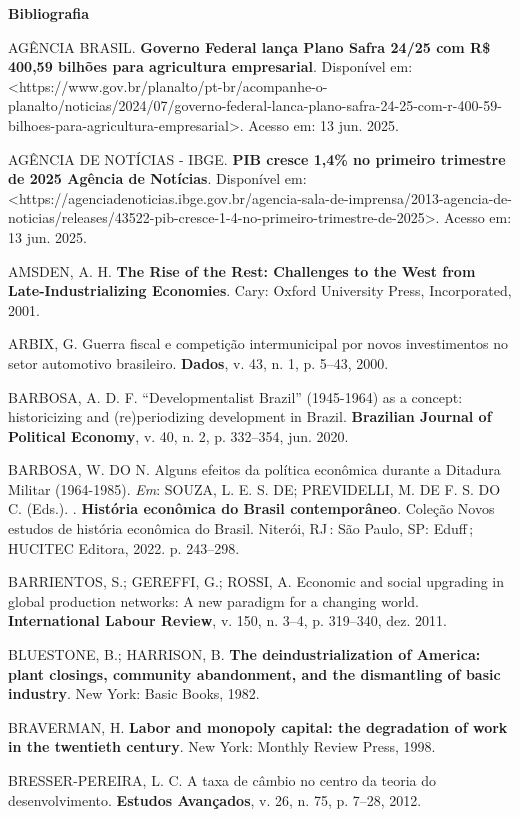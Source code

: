 \textbf{Bibliografia}

AGÊNCIA BRASIL. \textbf{Governo Federal lança Plano Safra 24/25 com R\$
400,59 bilhões para agricultura empresarial}. Disponível em:
\textless https://www.gov.br/planalto/pt-br/acompanhe-o-planalto/noticias/2024/07/governo-federal-lanca-plano-safra-24-25-com-r-400-59-bilhoes-para-agricultura-empresarial\textgreater.
Acesso em: 13 jun. 2025.

AGÊNCIA DE NOTÍCIAS - IBGE. \textbf{PIB cresce 1,4\% no primeiro
trimestre de 2025 \textbar{} Agência de Notícias}. Disponível em:
\textless https://agenciadenoticias.ibge.gov.br/agencia-sala-de-imprensa/2013-agencia-de-noticias/releases/43522-pib-cresce-1-4-no-primeiro-trimestre-de-2025\textgreater.
Acesso em: 13 jun. 2025.

AMSDEN, A. H. \textbf{The Rise of the Rest: Challenges to the West from
Late-Industrializing Economies}. Cary: Oxford University Press,
Incorporated, 2001.

ARBIX, G. Guerra fiscal e competição intermunicipal por novos
investimentos no setor automotivo brasileiro. \textbf{Dados}, v. 43, n.
1, p. 5--43, 2000.

BARBOSA, A. D. F. ``Developmentalist Brazil'' (1945-1964) as a concept:
historicizing and (re)periodizing development in Brazil.
\textbf{Brazilian Journal of Political Economy}, v. 40, n. 2, p.
332--354, jun. 2020.

BARBOSA, W. DO N. Alguns efeitos da política econômica durante a
Ditadura Militar (1964-1985). \emph{Em}: SOUZA, L. E. S. DE; PREVIDELLI,
M. DE F. S. DO C. (Eds.). . \textbf{História econômica do Brasil
contemporâneo}. Coleção Novos estudos de história econômica do Brasil.
Niterói, RJ\,: São Paulo, SP: Eduff\,; HUCITEC Editora, 2022. p.
243--298.

BARRIENTOS, S.; GEREFFI, G.; ROSSI, A. Economic and social upgrading in
global production networks: A new paradigm for a changing world.
\textbf{International Labour Review}, v. 150, n. 3--4, p. 319--340, dez.
2011.

BLUESTONE, B.; HARRISON, B. \textbf{The deindustrialization of America:
plant closings, community abandonment, and the dismantling of basic
industry}. New York: Basic Books, 1982.

BRAVERMAN, H. \textbf{Labor and monopoly capital: the degradation of
work in the twentieth century}. New York: Monthly Review Press, 1998.

BRESSER-PEREIRA, L. C. A taxa de câmbio no centro da teoria do
desenvolvimento. \textbf{Estudos Avançados}, v. 26, n. 75, p. 7--28,
2012.

